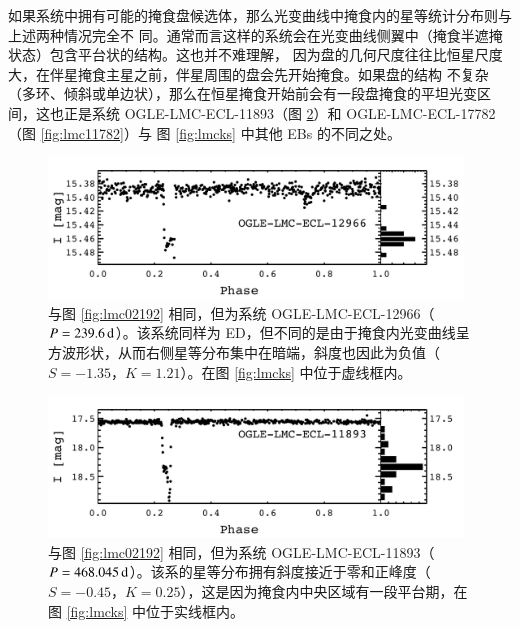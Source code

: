 如果系统中拥有可能的掩食盘候选体，那么光变曲线中掩食内的星等统计分布则与上述两种情况完全不
同。通常而言这样的系统会在光变曲线侧翼中（掩食半遮掩状态）包含平台状的结构。这也并不难理解，
因为盘的几何尺度往往比恒星尺度大，在伴星掩食主星之前，伴星周围的盘会先开始掩食。如果盘的结构
不复杂（多环、倾斜或单边状），那么在恒星掩食开始前会有一段盘掩食的平坦光变区间，这也正是系统 
OGLE-LMC-ECL-11893（图 \ref{fig:lmc11893}）和 OGLE-LMC-ECL-17782（图 \ref{fig:lmc11782}）与
图 \ref{fig:lmcks} 中其他 EBs 的不同之处。

\begin{figure}[t]
\centering
\includegraphics[width=0.98\textwidth,trim={0.0in 0.2in 0 0}]{figures/chapter3/f7_lmc12966.pdf}
\caption{与图 \ref{fig:lmc02192} 相同，但为系统 OGLE-LMC-ECL-12966（$P = 239.6\, \mathrm{d}$）。该系统同样为 ED，但不同的是由于掩食内光变曲线呈方波形状，从而右侧星等分布集中在暗端，斜度也因此为负值（$S=-1.35$，$K=1.21$）。在图 \ref{fig:lmcks} 中位于虚线框内。}
\label{fig:lmc12966}
\end{figure}


\begin{figure}[t]
\centering
\includegraphics[width=0.98\textwidth,trim={0.0in 0.2in 0 0}]{figures/chapter3/f8_lmc11893.pdf}
\caption{与图 \ref{fig:lmc02192} 相同，但为系统 OGLE-LMC-ECL-11893（$P = 468.045\, \mathrm{d}$）。该系的星等分布拥有斜度接近于零和正峰度（$S=-0.45$，$K=0.25$），这是因为掩食内中央区域有一段平台期，在图 \ref{fig:lmcks} 中位于实线框内。}
\label{fig:lmc11893}
\end{figure}


